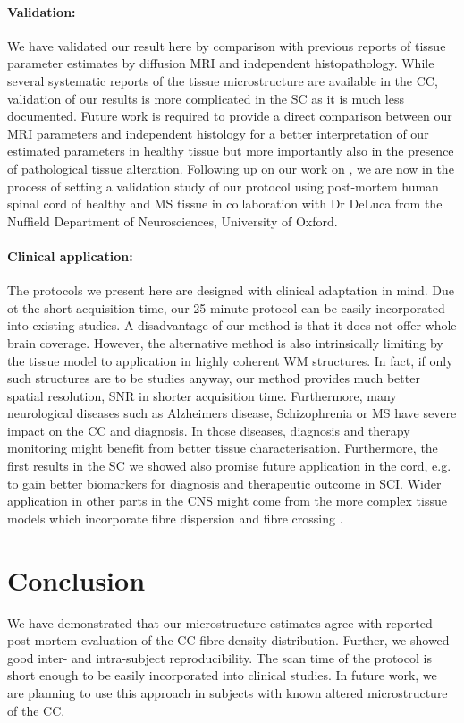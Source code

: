 \paragraph{Validation: } We have validated our result here by comparison with previous reports of tissue parameter estimates by diffusion MRI and independent histopathology. While several systematic reports of the tissue microstructure are available in the CC, validation of our results is more complicated in the SC as it is much less documented. Future work is required to provide a direct comparison between our MRI parameters and independent histology for a better interpretation of our estimated parameters in healthy tissue but more importantly also in the presence of pathological tissue alteration. Following up on our work on \SFasym{}, we are now in the process of setting a validation study of our protocol using post-mortem human spinal cord of healthy and MS tissue in collaboration with Dr DeLuca from the Nuffield Department of Neurosciences, University of Oxford.

\paragraph{Clinical application: } The protocols we present here are designed with clinical adaptation in mind. Due ot the short acquisition time, our 25 minute protocol can be easily incorporated into existing studies. A disadvantage of our method is that it does not offer whole brain coverage. However, the alternative \OI{} method is also intrinsically limiting by the tissue model to application in highly coherent WM structures. In fact, if only such structures are to be studies anyway, our method provides much better spatial resolution, SNR in shorter acquisition time. Furthermore, many neurological diseases such as Alzheimers disease, Schizophrenia or MS have severe impact on the CC and diagnosis. In those diseases, diagnosis and therapy monitoring might benefit from better tissue characterisation. Furthermore, the first results in the SC we showed also promise future application in the cord, e.g. to gain better biomarkers for diagnosis and therapeutic outcome in SCI. Wider application in other parts in the CNS might come from the more complex tissue models which incorporate fibre dispersion and fibre crossing \cite{Zhang:2011}.

\section{Conclusion}
We have demonstrated that our microstructure estimates agree with reported post-mortem evaluation of the CC fibre density distribution. Further, we showed good inter- and intra-subject reproducibility. The scan time of the protocol is short enough to be easily incorporated into clinical studies. In future work, we are planning to use this approach in subjects with known altered microstructure of the CC.
